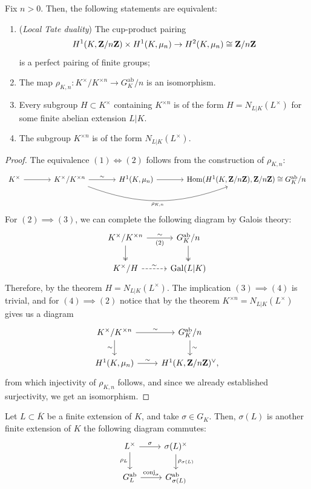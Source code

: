 \documentclass{article}
\begin{document}
\begin{lem}
		Fix $n>0$. Then, the following statements are equivalent:
		\begin{enumerate}
				\item (\emph{Local Tate duality}) The cup-product pairing
				\[
					H^1(K,\mathbf{Z}/n\mathbf{Z})\times H^1(K,\mu_n)\to H^2(K,\mu_n)\cong \mathbf{Z}/n\mathbf{Z}
				\]
				is a perfect pairing of finite groups;
				\item The map $\rho_{K,n}: K^\times / K^{\times n} \to G_K^\text{ab}/n$ is an isomorphism.
				\item Every subgroup $H\subset K^\times$ containing $K^{\times n}$ is of the form $H=N_{L|K}(L^\times)$ for some finite abelian extension $L|K$.
				\item The subgroup $K^{\times n}$ is of the form $N_{L|K}(L^\times)$.
		\end{enumerate}
\end{lem}
\begin{proof}
		The equivalence $(1)\iff (2)$ follows from the construction of $\rho_{K,n}$:
		\[
		\begin{tikzcd}[column sep=large]
			K^\times \arrow[r] &
			K^\times / K^{\times n}
				\arrow[r, "\sim"]
				\arrow[bend right=20, rr, "\rho_{K,n}"'] &
			H^1(K,\mu_n) \arrow[r]	&
			\Hom(H^1(K,\Z/n\Z),\Z/n\Z) \cong G_K^\text{ab}/n
		\end{tikzcd}
		\]
		For $(2)\implies (3)$, we can complete the following diagram by Galois theory:
		\[
		\begin{tikzcd}
			K^\times / K^{\times n} \arrow[r, "\sim ", "(2)"'] \arrow[d, two heads] & G_K^\text{ab}/n \arrow[d, two heads] \\
			K^\times / H \arrow[r, dashed, "\sim"] & \Gal(L|K)
		\end{tikzcd}
		\]
		Therefore, by the theorem $H=N_{L|K}(L^\times)$. The implication $(3)\implies (4)$ is trivial, and for $(4)\implies (2)$ notice that by the theorem $K^{\times n}=N_{L|K}(L^\times)$ gives us a diagram
		\[
		\begin{tikzcd}
			K^\times / K^{\times n} \arrow[r, "\sim"] \arrow[d, "\sim"'] & G_K^\text{ab}/n \arrow[d, "\sim"] \\
			H^1(K,\mu_n) \arrow[r, "\sim"] & H^1(K,\Z/n\Z)^\vee,
		\end{tikzcd}
		\]
		from which injectivity of $\rho_{K,n}$ follows, and since we already established surjectivity, we get an isomorphism.
\end{proof}
\begin{lem}
				Let $L\subset \overline{K}$ be a finite extension of $K$, and take $\sigma \in G_K$. Then, $\sigma(L)$ is another finite extension of $K$ the following diagram commutes:
				\[
				\begin{tikzcd}
					L^\times \arrow[r, "\sigma"] \arrow[d, "\rho_L"'] & \sigma(L)^\times \arrow[d, "\rho_{\sigma(L)}"] \\
					G_L^\text{ab} \arrow[r, "\operatorname{conj}_\sigma"] & G_{\sigma(L)}^\text{ab}
				\end{tikzcd}
				\]
		\end{lem}
\end{document}
